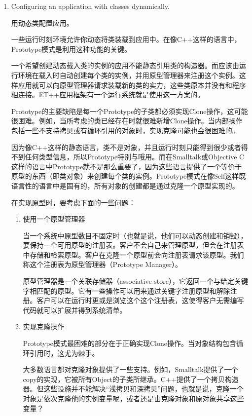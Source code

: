 \begin{enumerate}
\item Configuring an application with classes dynamically.

	  用动态类配置应用。

	  一些运行时刻环境允许你动态将类装载到应用中。在像C++这样的语言中，Prototype模式是利用这种功能的关键。

	  一个希望创建动态载入类的实例的应用不能静态引用类的构造器。而应该由运行环境在载入时自动创建每个类的实例，并用原型管理器来注册这个实例。这样应用就可以向原型管理器请求装载新的类的实力，这些类原本并没有和程序相连接。ET++应用框架有一个运行系统就是使用这一方案的。

	  Prototype的主要缺陷是每一个Prototype的子类都必须实现Clone操作，这可能很困难。例如，当所考虑的类已经存在时就很难新增Clone操作。当内部操作包括一些不支持拷贝或有循环引用的对象时，实现克隆可能也会很困难的。

      因为像C++这样的静态语言，类不是对象，并且运行时刻只能得到很少或者得不到任何类型信息，所以Prototype特别与哦用。而在Smalltalk或Objective C这样的语言中Prototype就不是那么重要了，因为这些语言提供了一个等价于原型的东西（即类对象）来创建每个类的实例。Prototype模式在像Self这样既语言性的语言中是固有的，所有对象的创建都是通过克隆一个原型实现的。

	  在实现原型时，要考虑下面的一些问题：
	  
	  \begin{enumerate}

	  \item 使用一个原型管理器

	  当一个系统中原型数目不固定时（也就是说，他们可以动态创建和销毁），要保持一个可用原型的注册表。客户不会自己来管理原型，但会在注册表中存储和检索原型。客户在克隆一个原型前会向注册表请求该原型。我们称这个注册表为原型管理器（Prototype Manager）。

	  原型管理器是一个关联存储器（associative store），它返回一个与给定关键字相匹配的原型。它有一些操作可以用来通过关键字注册原型和解除注册。客户可以在运行时更或是浏览这个这个注册表，这使得客户无需编写代码就可以扩展并得到系统清单。

	  \item 实现克隆操作

	  Prototype模式最困难的部分在于正确实现Clone操作。当对象结构包含循环引用时，这尤为棘手。

	  大多数语言都对克隆对象提供了一些支持。例如，Smalltalk提供了一个copy的实现，它被所有Object的子类所继承。C++提供了一个拷贝构造器。但这些设施并不能解决“浅拷贝和深拷贝”问题，也就是说，克隆一个对象是依次克隆他的实例变量呢，或者还是由克隆对象和原对象共享这些变量？


\end{enumerate}
\end{enumerate}
